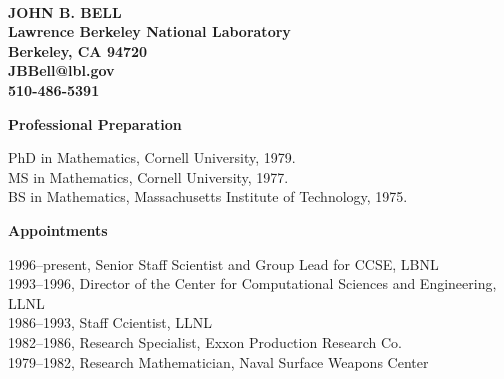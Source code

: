 \documentclass[11pt,letterpaper,english]{article}
\begin{document}
\setlength{\parindent}{0in} %

\pagestyle{fancy}   \renewcommand{%
\headrulewidth}{0.0pt}



\\
{\bf JOHN B. BELL}\\
{\bf Lawrence Berkeley National Laboratory \\
Berkeley, CA 94720 \\
JBBell@lbl.gov \\
510-486-5391} \smallskip

\begin{flushleft} {\bf Professional Preparation}
{\parindent 16pt

PhD in Mathematics, Cornell University, 1979. \\ 
MS in Mathematics, Cornell University, 1977. \\ 
BS in Mathematics, Massachusetts Institute of Technology, 1975. \\ 
}

\vspace{.04in}
{\bf Appointments}
{\parindent 16pt

1996--present, Senior Staff Scientist and Group Lead for CCSE, LBNL \\ 
1993--1996, Director of the Center for Computational Sciences and Engineering, LLNL \\ 
1986--1993, Staff Ccientist, LLNL \\ 
1982--1986, Research Specialist, Exxon Production Research Co. \\
1979--1982, Research Mathematician, Naval Surface Weapons Center \\
}


\end{flushleft}
\end{document}
